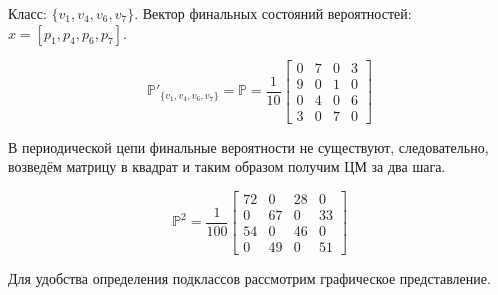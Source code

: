 \noindent Класс: $\{ v_1, v_4, v_6, v_7 \}$. Вектор финальных состояний вероятностей: $x = [p_1, p_4, p_6, p_7]$.

\[
\mathbb{P}'_{ \{ v_1, v_4, v_6, v_7 \} } = \mathbb{P} = \frac{1}{10}
\begin{bmatrix}
0 & 7 & 0 & 3 \\
9 & 0 & 1 & 0 \\
0 & 4 & 0 & 6 \\
3 & 0 & 7 & 0
\end{bmatrix}
\]

В периодической цепи финальные вероятности не существуют, следовательно, возведём матрицу в квадрат и таким образом получим ЦМ за два шага.

\[
\mathbb{P}^2 = \frac{1}{100}
\begin{bmatrix}
72 & 0  & 28 & 0  \\
0  & 67 & 0  & 33 \\
54 & 0  & 46 & 0  \\
0  & 49 & 0  & 51
\end{bmatrix}
\]

Для удобства определения подклассов рассмотрим графическое представление.
\begin{figure}[H]
\end{figure}

